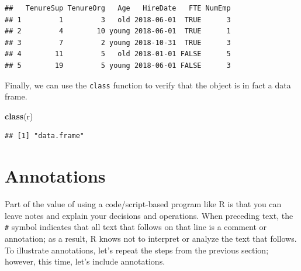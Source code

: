 \documentclass[]{book}
\newenvironment{Shaded}{\begin{snugshade}}{\end{snugshade}}
\newcommand{\KeywordTok}[1]{\textcolor[rgb]{0.13,0.29,0.53}{\textbf{#1}}}
\newcommand{\NormalTok}[1]{#1}
\begin{document}
\begin{verbatim}
##   TenureSup TenureOrg   Age   HireDate   FTE NumEmp
## 1         1         3   old 2018-06-01  TRUE      3
## 2         4        10 young 2018-06-01  TRUE      1
## 3         7         2 young 2018-10-31  TRUE      3
## 4        11         5   old 2018-01-01 FALSE      5
## 5        19         5 young 2018-06-01 FALSE      3
\end{verbatim}

Finally, we can use the \texttt{class} function to verify that the
object is in fact a data frame.

\begin{Shaded}
\begin{Highlighting}[]
\KeywordTok{class}\NormalTok{(r)}
\end{Highlighting}
\end{Shaded}

\begin{verbatim}
## [1] "data.frame"
\end{verbatim}

\hypertarget{annotate}{\section{Annotations}\label{annotate}}

Part of the value of using a code/script-based program like R is that
you can leave notes and explain your decisions and operations. When
preceding text, the \texttt{\#} symbol indicates that all text that
follows on that line is a comment or annotation; as a result, R knows
not to interpret or analyze the text that follows. To illustrate
annotations, let's repeat the steps from the previous section; however,
this time, let's include annotations.
\end{document}
